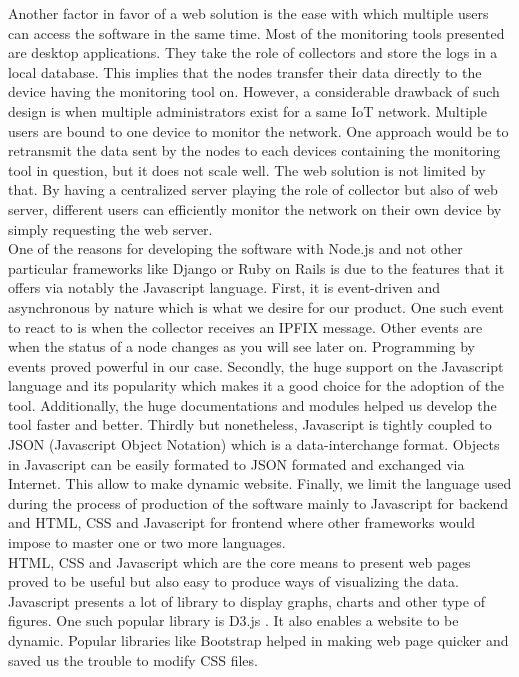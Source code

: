 Another factor in favor of a web solution is the ease with which multiple users can access the software in the same time. Most of the monitoring tools presented are desktop applications. They take the role of collectors and store the logs in a local database. This implies that the nodes transfer their data directly to the device having the monitoring tool on. However, a considerable drawback of such design is when multiple administrators exist for a same IoT network. Multiple users are bound to one device to monitor the network. One approach would be to retransmit the data sent by the nodes to each devices containing the monitoring tool in question, but it does not scale well. The web solution is not limited by that. By having a centralized server playing the role of collector but also of web server, different users can efficiently monitor the network on their own device by simply requesting the web server. \\

One of the reasons for developing the software with Node.js and not other particular frameworks like Django or Ruby on Rails is due to the features that it offers via notably the Javascript language. First, it is event-driven and asynchronous by nature which is what we desire for our product. One such event to react to is when the collector receives an IPFIX message. Other events are when the status of a node changes as you will see later on. Programming by events proved powerful in our case. Secondly, the huge support on the Javascript language and its popularity which makes it a good choice for the adoption of the tool. Additionally, the huge documentations and modules helped us develop the tool faster and better. Thirdly but nonetheless, Javascript is tightly coupled to JSON (Javascript Object Notation) \cite{website:json} which is a data-interchange format. Objects in Javascript can be easily formated to JSON formated and exchanged via Internet. This allow to make dynamic website. Finally, we limit the language used during the process of production of the software mainly to Javascript for backend and HTML, CSS and Javascript for frontend where other frameworks would impose to master one or two more languages.\\

HTML, CSS and Javascript which are the core means to present web pages proved to be useful but also easy to produce ways of visualizing the data. Javascript presents a lot of library to display graphs, charts and other type of figures. One such popular library is D3.js \cite{website:d3}. It also enables a website to be dynamic. Popular libraries like Bootstrap helped in making web page quicker and saved us the trouble to modify CSS files.\\

